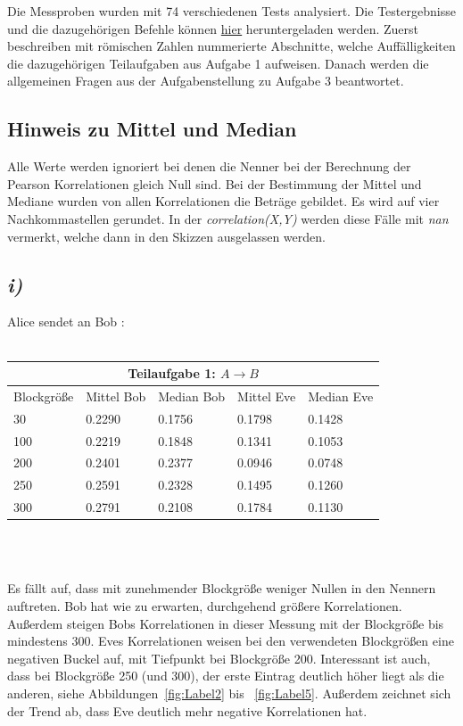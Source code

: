 \documentclass[12pt,a4paper]{article}
\begin{document}
Die Messproben wurden mit 74 verschiedenen Tests analysiert. 
Die Testergebnisse und die dazugehörigen Befehle können 
\href{https://mega.nz/file/rg4HzTJB#4DSJFln2TZiz9BZ_8xZObXRsGiheQ3Otaf_7wMUAqTQ}
{hier} 
heruntergeladen werden. Zuerst beschreiben mit römischen 
Zahlen nummerierte Abschnitte, welche Auffälligkeiten die 
dazugehörigen Teilaufgaben aus Aufgabe 1 aufweisen. Danach 
werden die allgemeinen Fragen aus der Aufgabenstellung zu 
Aufgabe 3 beantwortet.


\subsection*{Hinweis zu Mittel und Median}

Alle Werte werden ignoriert bei denen die Nenner bei der 
Berechnung der Pearson Korrelationen gleich Null sind. 
Bei der Bestimmung der Mittel und Mediane wurden von allen 
Korrelationen die Beträge gebildet. Es wird auf vier 
Nachkommastellen gerundet. In der \textit{correlation(X,Y)}
werden diese Fälle mit \textit{nan} vermerkt, welche dann 
in den Skizzen ausgelassen werden.


\subsection*{\textit{i)}}


Alice sendet an Bob :\\~\\


\Large
\begin{tabular}{ |p{3cm}|||p{3cm}|p{3cm}||p{3cm}|p{3cm}|}
    \hline
    \multicolumn{5}{|c|}{Teilaufgabe 1: $A\rightarrow B$} \\
    \hline
    Blockgröße & Mittel Bob & Median Bob & Mittel Eve & Median Eve\\
    \hline
    \hspace{3.2mm}30 & 0.2290 & 0.1756 & 0.1798 & 0.1428\\
    100 & 0.2219 & 0.1848 & 0.1341 & 0.1053\\
    200 & 0.2401 & 0.2377 & 0.0946 & 0.0748\\
    250 & 0.2591 & 0.2328 & 0.1495 & 0.1260\\
    300 & 0.2791 & 0.2108 & 0.1784 & 0.1130\\
    \hline
\end{tabular}
\\[0.7cm]\\
\normalsize

Es fällt auf, dass mit zunehmender Blockgröße weniger Nullen in den 
Nennern auftreten. Bob hat wie zu erwarten, durchgehend größere 
Korrelationen. Außerdem steigen Bobs Korrelationen in dieser Messung 
mit der Blockgröße bis mindestens 300. Eves Korrelationen weisen
bei den verwendeten Blockgrößen eine negativen Buckel auf, mit 
Tiefpunkt bei Blockgröße 200. Interessant ist auch, dass bei 
Blockgröße 250 (und 300), der erste Eintrag deutlich höher liegt 
als die anderen, siehe Abbildungen~\ref{fig:Label2} bis 
~\ref{fig:Label5}. Außerdem zeichnet sich 
der Trend ab, dass Eve deutlich mehr negative Korrelationen hat.
\end{document}
